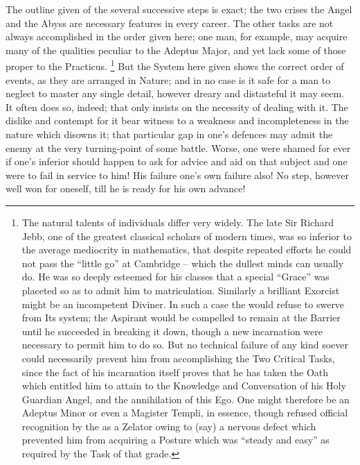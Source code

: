 The outline given of the several successive steps is exact; the two crises \textemdash{} the Angel and the Abyss \textemdash{} are necessary features in every career. The other tasks are not always accomplished in the order given here; one man, for example, may acquire many of the qualities peculiar to the Adeptus Major, and yet lack some of those proper to the Practicus. \footnote{The natural talents of individuals differ very widely. The late Sir Richard Jebb, one of the greatest classical scholars of modern times, was so inferior to the average mediocrity in mathematics, that despite repeated efforts he could not pass the \enquote{little go} at Cambridge -- which the dullest minds can usually do. He was so deeply esteemed for his classes that a special \enquote{Grace} was placeted so as to admit him to matriculation. Similarly a brilliant Exorcist might be an incompetent Diviner. In such a case the \Argentium{} would refuse to swerve from Its system; the Aspirant would be compelled to remain at the Barrier until he succeeded in breaking it down, though a new incarnation were necessary to permit him to do so. But no technical failure of any kind soever could necessarily prevent him from accomplishing the Two Critical Tasks, since the fact of his incarnation itself proves that he has taken the Oath which entitled him to attain to the Knowledge and Conversation of his Holy Guardian Angel, and the annihilation of this Ego. One might therefore be an Adeptus Minor or even a Magister Templi, in essence, though refused official recognition by the \Argentium{} as a Zelator owing to (say) a nervous defect which prevented him from acquiring a Posture which was \enquote{steady and easy} as required by the Task of that grade.} But the System here given shows the correct order of events, as they are arranged in Nature; and in no case is it safe for a man to neglect to master any single detail, however dreary and distasteful it may seem. It often does so, indeed; that only insists on the necessity of dealing with it. The dislike and contempt for it bear witness to a weakness and incompleteness in the nature which disowns it; that particular gap in one's defences may admit the enemy at the very turning-point of some battle. Worse, one were shamed for ever if one's inferior should happen to ask for advice and aid on that subject and one were to fail in service to him! His failure \textemdash{} one's own failure also! No step, however well won for oneself, till he is ready for his own advance!


